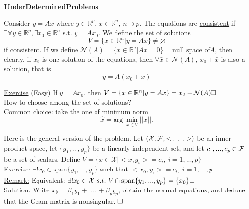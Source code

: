 \documentclass[letterpaper]{article}
\begin{document}
\newcommand{\trace}{\mathrm{trace}}
\newcommand{\real}{\mathbb R}  %
\newcommand{\nat}{\mathbb R}   %
\newcommand{\cp}{\mathbb C}    %
\newcommand{\ds}{\displaystyle}
\newcommand{\mf}[2]{\frac{\ds #1}{\ds #2}}
\newcommand{\book}[2]{{Luenberger, Page~#1, }{Prob.~#2}}
\newcommand{\spanof}[1]{\textrm{span} \{ #1 \}}
\parindent 0pt

\begin{center}
{\large \bf UnderDeterminedProblems}
\end{center}

\vspace*{1cm}

Consider $y = Ax$ where $y \in \real^p$, $x \in \real^n$, $n \supset p$. The equations are \underline{consistent} if $\exists \forall y \in \real^p, \exists x_0 \in \real^n$ s.t. $y = Ax_0$. We define the set of solutions
$$V = \{x \in \real^n | y = Ax\} \neq \varnothing$$
if consistent. If we define $\mathcal{N}(A) = \{x \in \real^n|Ax = 0\} = \text{null space of} A$, then clearly, if $x_0$ is one solution of the equations, then $\forall \bar{x} \in  \mathcal{N}(A)$, $x_0+\bar{x}$ is also a solution, that is
$$y = A(x_0+\bar{x})$$

\underline{Exercise} (Easy) If $y = Ax_0$, then $V = \{x\in \real^n|y = Ax\} = x_0+ \mathcal{N}(A) \hfill \square$\\

How to choose among the set of solutions?\\
Common choice: take the one of minimum norm
$$\hat{x} = \mathrm{arg}~\min_{x \in V} ||x||.$$

Here is the general version of the problem. Let $(\cal{X}, \cal{F}, <.~,~.>)$ be an inner product space, let $\{y_1, ..., y_p\}$ be a linearly independent set, and let $c_1, ..., c_p \in \cal{F}$ be a set of scalars. Define $V = \{x\in \mathcal{X} | <x, y_i> = c_i,~i=1, ...,p \}$\\

\underline{Exercise:} $\exists ! x_0 \in \spanof{y_1, ..., y_p}$ such that $<x_0, y_i> = c_i, ~ i = 1,...,p$.\\

\underline{Remark:} Equivalent: $\exists ! x_0 \in \mathcal{X} ~s.t. ~V \cap \spanof{y_1, ..., y_p} = \{x_0\} \hfill \square$\\

\underline{Solution:} Write $x_0 = \beta_1 y_1+~...~ +\beta_p y_p$, obtain the normal equations, and deduce that the Gram matrix is nonsingular. $\hfill \square$\\
\end{document}
